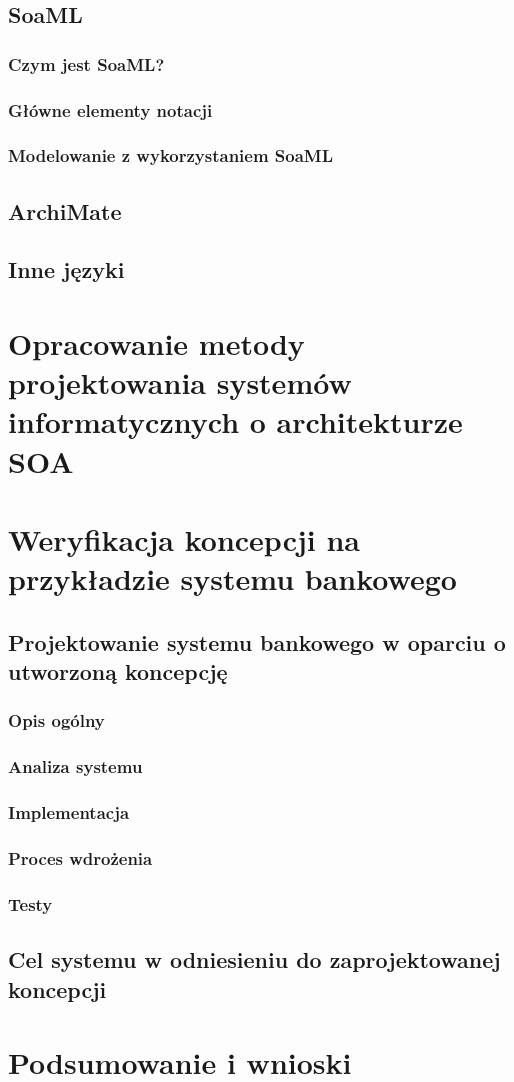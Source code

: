 \section{SoaML}
\subsection{Czym jest SoaML?}
\subsection{Główne elementy notacji}
\subsection{Modelowanie z wykorzystaniem SoaML}
\section{ArchiMate}
\section{Inne języki}

\chapter{Opracowanie metody projektowania systemów informatycznych o architekturze SOA}

\chapter{Weryfikacja koncepcji na przykładzie systemu bankowego}
\section{Projektowanie systemu bankowego w oparciu o utworzoną koncepcję}
\subsection{Opis ogólny}
\subsection{Analiza systemu}
\subsection{Implementacja}
\subsection{Proces wdrożenia}
\subsection{Testy}
\section{Cel systemu w odniesieniu do zaprojektowanej koncepcji}
\chapter{Podsumowanie i wnioski}
